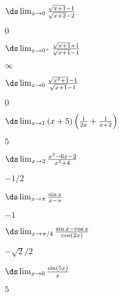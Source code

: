 \begin{multicols}{2}[]
\begin{enumialphparenastyle}
\begin{ex} 
 $\ds\lim_{x\to0}{\sqrt{x+1}-1\over \sqrt{x+2}-2}$
\begin{sol}
 $0$
\end{sol}
\end{ex}

\begin{ex} 
 $\ds\lim_{x\to0^+}{\sqrt{x+1}+1\over\sqrt{x+1}-1}$
\begin{sol}
 $\infty$
\end{sol}
\end{ex}

\begin{ex} 
 $\ds\lim_{x\to0}{\sqrt{x^2+1}-1\over\sqrt{x+1}-1}$
\begin{sol}
 $0$
\end{sol}
\end{ex}

\begin{ex} 
 $\ds\lim_{x\to1}{(x+5)\left({1\over 2x}+{1\over x+2}\right)}$
\begin{sol}
 $5$
\end{sol}
\end{ex}

\begin{ex} 
 $\ds\lim_{x\to2}{x^3-6x-2\over x^3+4}$
\begin{sol}
 $-1/2$
\end{sol}
\end{ex}


\begin{ex} 
 {$\ds \lim_{x\to \pi} \frac{\sin x}{x-\pi}$}

\begin{sol}
  {$-1$}
\end{sol}

\end{ex}


\begin{ex} 
{$\ds \lim_{x\to \pi/4} \frac{\sin x-\cos x}{\cos (2x)}$}
 
\begin{sol}
 {$-\sqrt{2}/2$}
\end{sol}

\end{ex}

\begin{ex} 
 {$\ds \lim_{x\to 0} \frac{\sin (5x)}{x}$}

\begin{sol}
  {$5$}
\end{sol}


\end{ex}
\end{enumialphparenastyle}
\end{multicols}
